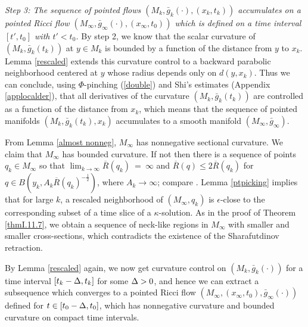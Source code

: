 \bigskip
{\em Step 3: The  sequence of pointed
flows $(M_k,\bar g_k(\cdot),(x_k,t_k))$ accumulates on a
pointed Ricci flow $(M_\infty,\bar g_\infty(\cdot),(x_\infty,t_0))$
which is defined on a time interval $[t',t_0]$ with $t'< t_0$.}
By step 2, we know that the scalar curvature   of $(M_k,\bar g_k(t_k))$
at $y\in M_k$ is bounded by a function of  the distance from
$y$ to $x_k$.
Lemma \ref{rescaled} extends this curvature control to a
backward parabolic neighborhood centered at $y$ whose radius depends only
on $d(y,x_k)$.  Thus we can conclude,
using $\Phi$-pinching (\ref{double}) and
Shi's estimates (Appendix \ref{applocalder}),
that all derivatives of the
curvature $(M_k,\bar g_k(t_k))$ are controlled as a function
of the distance from $x_k$, which means that the
sequence of pointed manifolds $(M_k,\bar g_k(t_k),x_k)$ accumulates
to a smooth manifold $(M_\infty,\bar g_\infty)$.

From Lemma \ref{almost nonneg},
$M_\infty$ has nonnegative sectional curvature.
We claim that $M_\infty$ has bounded curvature.
If not then there is a sequence of points
$q_k \in M_\infty$ so that
$\lim_{k \rightarrow \infty} \overline{R}(q_k) \: = \: \infty$
and $\overline{R}(q) \le 2 \overline{R}(q_k)$ for
$q \in B(y_k, A_k \overline{R}(q_k)^{- \frac12})$, where
$A_k \rightarrow \infty$; compare \cite[Lemma 22.2]{Hamilton}.
Lemma \ref{ptpicking} implies that for large $k$, a rescaled neighborhood of
$(M_\infty, q_k)$ is $\epsilon$-close to the corresponding subset
of a time slice of a $\kappa$-solution. As in the proof of
Theorem \ref{thmI.11.7}, we obtain a sequence of neck-like regions
in $M_\infty$ with smaller
and smaller cross-sections, which contradicts the
existence of the Sharafutdinov retraction.

By Lemma \ref{rescaled} again,
we now get curvature control
 on $(M_k,\bar g_k(\cdot))$ for a time
interval $[t_k-\Delta,t_k]$ for some $\Delta>0$, and hence
we can extract a  subsequence which converges to a pointed Ricci flow
$(M_\infty,(x_\infty,t_0),\bar g_\infty(\cdot))$ defined
for $t\in[t_0 - \Delta,t_0]$, which has nonnegative curvature and bounded
curvature on
compact time intervals.


